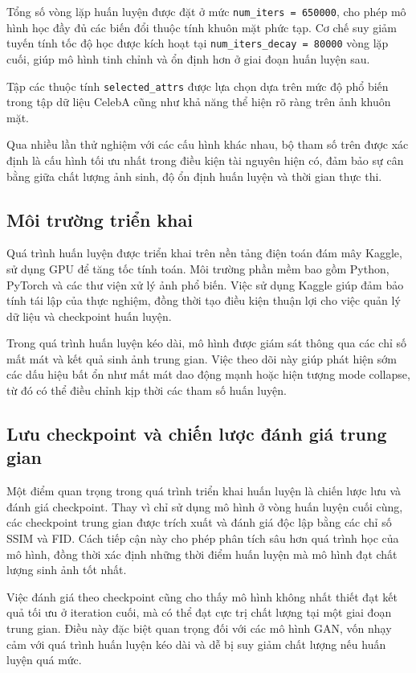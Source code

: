 \documentclass[../DoAn.tex]{subfiles}
\begin{document}
Tổng số vòng lặp huấn luyện được đặt ở mức \texttt{num\_iters = 650000}, cho phép mô hình học đầy đủ các biến đổi thuộc tính khuôn mặt phức tạp. Cơ chế suy giảm tuyến tính tốc độ học được kích hoạt tại \texttt{num\_iters\_decay = 80000} vòng lặp cuối, giúp mô hình tinh chỉnh và ổn định hơn ở giai đoạn huấn luyện sau.

Tập các thuộc tính \texttt{selected\_attrs} được lựa chọn dựa trên mức độ phổ biến trong tập dữ liệu CelebA cũng như khả năng thể hiện rõ ràng trên ảnh khuôn mặt. 

Qua nhiều lần thử nghiệm với các cấu hình khác nhau, bộ tham số trên được xác định là cấu hình tối ưu nhất trong điều kiện tài nguyên hiện có, đảm bảo sự cân bằng giữa chất lượng ảnh sinh, độ ổn định huấn luyện và thời gian thực thi.


\subsection{Môi trường triển khai}

Quá trình huấn luyện được triển khai trên nền tảng điện toán đám mây Kaggle, sử dụng GPU để tăng tốc tính toán. Môi trường phần mềm bao gồm Python, PyTorch và các thư viện xử lý ảnh phổ biến. Việc sử dụng Kaggle giúp đảm bảo tính tái lập của thực nghiệm, đồng thời tạo điều kiện thuận lợi cho việc quản lý dữ liệu và checkpoint huấn luyện.

Trong quá trình huấn luyện kéo dài, mô hình được giám sát thông qua các chỉ số mất mát và kết quả sinh ảnh trung gian. Việc theo dõi này giúp phát hiện sớm các dấu hiệu bất ổn như mất mát dao động mạnh hoặc hiện tượng mode collapse, từ đó có thể điều chỉnh kịp thời các tham số huấn luyện.

\subsection{Lưu checkpoint và chiến lược đánh giá trung gian}

Một điểm quan trọng trong quá trình triển khai huấn luyện là chiến lược lưu và đánh giá checkpoint. Thay vì chỉ sử dụng mô hình ở vòng huấn luyện cuối cùng, các checkpoint trung gian được trích xuất và đánh giá độc lập bằng các chỉ số SSIM và FID. Cách tiếp cận này cho phép phân tích sâu hơn quá trình học của mô hình, đồng thời xác định những thời điểm huấn luyện mà mô hình đạt chất lượng sinh ảnh tốt nhất.

Việc đánh giá theo checkpoint cũng cho thấy mô hình không nhất thiết đạt kết quả tối ưu ở iteration cuối, mà có thể đạt cực trị chất lượng tại một giai đoạn trung gian. Điều này đặc biệt quan trọng đối với các mô hình GAN, vốn nhạy cảm với quá trình huấn luyện kéo dài và dễ bị suy giảm chất lượng nếu huấn luyện quá mức.
\end{document}
